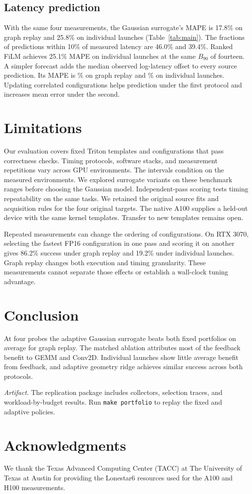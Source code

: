\documentclass[conference]{IEEEtran}
\begin{document}
\subsection{Latency prediction}
With the same four measurements, the Gaussian surrogate's MAPE is 17.8\%
on graph replay and 25.8\% on individual launches (Table~\ref{tab:main}).
The fractions of predictions within 10\% of measured latency are 46.0\%
and 39.4\%. Ranked FiLM achieves 25.1\% MAPE on individual launches at
the same $B_{90}$ of fourteen. A simpler forecast adds the median
observed log-latency offset to every source prediction. Its MAPE is
\GraphOffsetMAPE\% on graph replay and \LaunchOffsetMAPE\% on individual
launches. Updating correlated configurations helps prediction under the
first protocol and increases mean error under the second.

\section{Limitations}
Our evaluation covers fixed Triton templates and configurations that pass
correctness checks. Timing protocols, software stacks, and measurement
repetitions vary across GPU environments. The intervals condition on
the measured environments. We explored surrogate variants on these benchmark ranges before choosing
the Gaussian model. Independent-pass scoring tests timing repeatability on the same tasks. We retained the original source fits and acquisition rules for the four original targets.
The native A100 supplies a held-out device with the same kernel templates.
Transfer to new templates remains open.

Repeated measurements can change the ordering of configurations. On RTX 3070, selecting the fastest
FP16 configuration in one pass and scoring it on another gives 86.2\%
success under graph replay and 19.2\% under individual launches.
Graph replay changes both execution and timing granularity. These measurements cannot separate those effects or establish a wall-clock tuning advantage.

\section{Conclusion}
At four probes the adaptive Gaussian surrogate beats both fixed
portfolios on average for graph replay. The matched ablation attributes
most of the feedback benefit to GEMM and Conv2D. Individual launches
show little average benefit from feedback, and adaptive geometry ridge
achieves similar success across both protocols.

\noindent\textit{Artifact.} The replication package includes collectors,
selection traces, and workload-by-budget results. Run
\texttt{make portfolio} to replay the fixed and adaptive policies.

\section*{Acknowledgments}
We thank the Texas Advanced Computing Center (TACC) at The University of
Texas at Austin for providing the Lonestar6 resources used for the A100
and H100 measurements.



\end{document}
